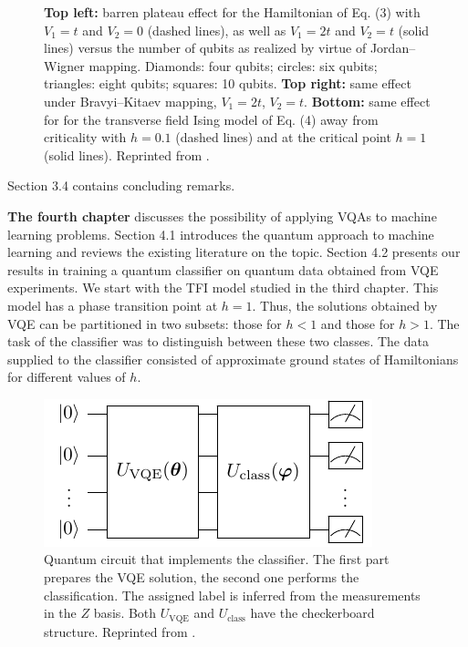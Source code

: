 \begin{figure}
\begin{subfigure}{.48\linewidth}
    \end{subfigure}
    \caption{\textbf{Top left:} barren plateau effect for the Hamiltonian of Eq. (3) with
    $V_1 = t$ and $V_2 = 0$ (dashed lines), as well as $V_1 = 2t$ and $V_2 = t$
    (solid lines) versus the number of qubits as realized by virtue of
    Jordan--Wigner mapping. Diamonds: four qubits; circles: six qubits;
    triangles: eight qubits; squares: 10 qubits. \textbf{Top right:} same effect under Bravyi--Kitaev mapping, $V_1 = 2t$, $V_2 = t$.
    \textbf{Bottom:} same effect for for the transverse field Ising model of Eq. (4) away from criticality with $h = 0.1$ (dashed lines) and at the critical point $h = 1$ (solid lines).    
    Reprinted from \cite{uvarov_variational_2020}.}
    \label{fig:plateaus_hubbard_ising}
\end{figure}

Section 3.4 contains concluding remarks. 

\textbf{The fourth chapter} discusses the possibility of applying VQAs to machine learning problems. Section 4.1 introduces the quantum approach to machine learning and reviews the existing literature on the topic. Section 4.2 presents our results in training a quantum classifier on quantum data obtained from VQE experiments. We start with the TFI model studied in the third chapter. This model has a phase transition point at $h=1$. Thus, the solutions obtained by VQE can be partitioned in two subsets: those for $h<1$ and those for $h>1$. The task of the classifier was to distinguish between these two classes. The data supplied to the classifier consisted of approximate ground states of Hamiltonians for different values of $h$.

\begin{figure}
    \centering
    \includegraphics[width=0.7\linewidth]{../figures/classifier_circuit.pdf}
    \caption{Quantum circuit that implements the classifier. The first part prepares the VQE solution, the second one performs the classification. The assigned label is inferred from the measurements in the $Z$ basis. Both $U_{\mathrm{VQE}}$ and $U_{\mathrm{class}}$ have the checkerboard structure. Reprinted from \cite{uvarov_machine_2020}.}
    \label{fig:classifier_scheme}
\end{figure}

